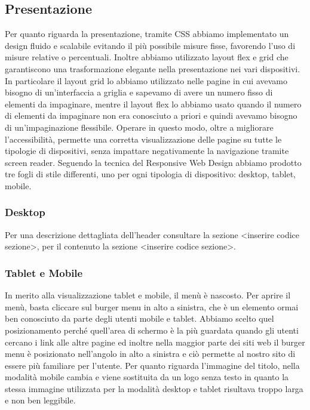 \documentclass[a4paper]{article}
\begin{document}
	\subsection{Presentazione}
	Per quanto riguarda la presentazione, tramite CSS abbiamo implementato un design fluido e scalabile evitando il più possibile misure fisse, favorendo l'uso di misure relative o percentuali. Inoltre abbiamo utilizzato layout flex e grid che garantiscono una trasformazione elegante nella presentazione nei vari dispositivi. In particolare il layout grid lo abbiamo utilizzato nelle pagine in cui avevamo bisogno di un'interfaccia a griglia e sapevamo di avere un numero fisso di elementi da impaginare, mentre il layout flex lo abbiamo usato quando il numero di elementi da impaginare non era conosciuto a priori e quindi avevamo bisogno di un'impaginazione flessibile. Operare in questo modo, oltre a migliorare l'accessibilità, permette una corretta visualizzazione delle pagine su tutte le tipologie di dispositivi, senza impattare negativamente la navigazione tramite screen reader. Seguendo la tecnica del Responsive Web Design abbiamo prodotto tre fogli di stile differenti, uno per ogni tipologia di dispositivo: desktop, tablet, mobile.

	\subsubsection{Desktop}
	Per una descrizione dettagliata dell'header consultare la sezione <inserire codice sezione>, per il contenuto la sezione <inserire codice sezione>.

	\subsubsection{Tablet e Mobile}
	In merito alla visualizzazione tablet e mobile, il menù è nascosto. Per aprire il menù, basta cliccare sul burger menu in alto a sinistra, che è un elemento ormai ben conosciuto da parte degli utenti mobile e tablet. Abbiamo scelto quel posizionamento perché quell'area di schermo è la più guardata quando gli utenti cercano i link alle altre pagine ed inoltre nella maggior parte dei siti web il burger menu è posizionato nell'angolo in alto a sinistra e ciò permette al nostro sito di essere più familiare per l'utente. Per quanto riguarda l'immagine del titolo, nella modalità mobile cambia e viene sostituita da un logo senza testo in quanto la stessa immagine utilizzata per la modalità desktop e tablet risultava troppo larga e non ben leggibile.
\end{document}
